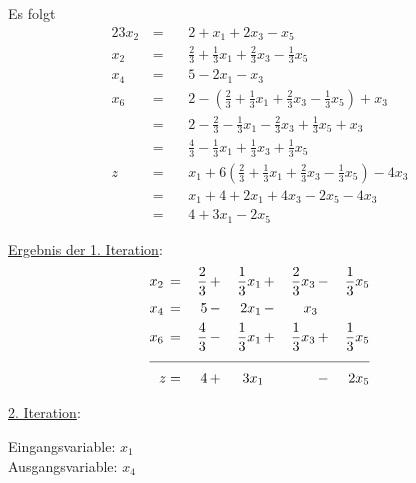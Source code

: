 \documentclass[10pt,a4paper,oneside,ngerman,numbers=noenddot]{scrartcl}
\begin{document}
		Es folgt
		\begin{alignat*}{2}
			3x_{2} \,&=&&\, 2 + x_{1} + 2x_{3} - x_{5} \\
			x_{2} \,&=&&\, \frac{2}{3} + \frac{1}{3}x_{1} + \frac{2}{3}x_{3} - \frac{1}{3}x_{5} \\
			x_{4} \,&=&&\, 5 - 2x_{1} - x_{3} \\
			x_{6} \,&=&&\, 2 - \left(\frac{2}{3} + \frac{1}{3}x_{1} + \frac{2}{3}x_{3} - \frac{1}{3}x_{5}\right) + x_{3} \\
			&=&&\, 2 - \frac{2}{3} - \frac{1}{3}x_{1} - \frac{2}{3}x_{3} + \frac{1}{3}x_{5} + x_{3} \\
			&=&&\, \frac{4}{3} - \frac{1}{3}x_{1} + \frac{1}{3}x_{3} + \frac{1}{3}x_{5} \\
			z \,&=&&\, x_{1} + 6\left(\frac{2}{3} + \frac{1}{3}x_{1} + \frac{2}{3}x_{3} - \frac{1}{3}x_{5}\right) - 4x_{3} \\
			&=&&\, x_{1} + 4 + 2x_{1} + 4x_{3} - 2x_{5} - 4x_{3} \\
			&=&&\, 4 + 3x_{1} - 2x_{5}
		\end{alignat*}
		
		\underline{Ergebnis der 1. Iteration}:
		\begin{alignat*}{5}
			x_{2} \,&=&\, \frac{2}{3} \,&+&\, \frac{1}{3}x_{1} \,&+&\, \frac{2}{3}x_{3} \,&-&\, \frac{1}{3}x_{5} \\
			x_{4} \,&=&\, 5 \,&-&\, 2x_{1} \,&-&\, x_{3} && \\
			x_{6} \,&=&\, \frac{4}{3} \,&-&\, \frac{1}{3}x_{1} \,&+&\, \frac{1}{3}x_{3} \,&+&\, \frac{1}{3}x_{5} \\ \cline{1 - 9}
			z &=& 4 \,&+&\, 3x_{1} && &-& 2x_{5}
		\end{alignat*}
		
		\underline{2. Iteration}:
		
		Eingangsvariable: $x_{1}$ \\
		Ausgangsvariable: $x_{4}$
		
\end{document}
